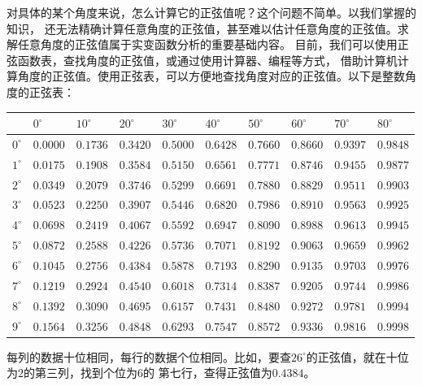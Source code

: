 \documentclass[12pt,UTF8,fontset=none]{ctexbook}
\begin{document}
对具体的某个角度来说，怎么计算它的正弦值呢？这个问题不简单。以我们掌握的知识，
还无法精确计算任意角度的正弦值，甚至难以估计任意角度的正弦值。求解任意角度的正弦值属于实变函数分析的重要基础内容。
目前，我们可以使用正弦函数表，查找角度的正弦值，或通过使用计算器、编程等方式，
借助计算机计算角度的正弦值。使用正弦表，可以方便地查找角度对应的正弦值。以下是整数角度的正弦表：

\begin{center}
    \begin{tabular}{| p{1em}<{\centering} | p{2.4em}<{\centering} | p{2.4em}<{\centering} | p{2.4em}<{\centering} | p{2.4em}<{\centering} | p{2.4em}<{\centering} | p{2.4em}<{\centering} | p{2.4em}<{\centering} | p{2.4em}<{\centering} | p{2.4em}<{\centering} |}
        \hline
                  & $0^\circ$& $10^\circ$ & $20^\circ$ & $30^\circ$ & $40^\circ$ & $50^\circ$ & $60^\circ$ & $70^\circ$ & $80^\circ$ \\ [0.5ex] 
        \hline
        $0^\circ$ & $0.0000$ &  $0.1736$  &  $0.3420$  &  $0.5000$  &  $0.6428$  &  $0.7660$  &  $0.8660$  &  $0.9397$  &  $0.9848$  \\
        \hline
        $1^\circ$ & $0.0175$ &  $0.1908$  &  $0.3584$  &  $0.5150$  &  $0.6561$  &  $0.7771$  &  $0.8746$  &  $0.9455$  &  $0.9877$  \\
        \hline
        $2^\circ$ & $0.0349$ &  $0.2079$  &  $0.3746$  &  $0.5299$  &  $0.6691$  &  $0.7880$  &  $0.8829$  &  $0.9511$  &  $0.9903$  \\
        \hline
        $3^\circ$ & $0.0523$ &  $0.2250$  &  $0.3907$  &  $0.5446$  &  $0.6820$  &  $0.7986$  &  $0.8910$  &  $0.9563$  &  $0.9925$  \\
        \hline
        $4^\circ$ & $0.0698$ &  $0.2419$  &  $0.4067$  &  $0.5592$  &  $0.6947$  &  $0.8090$  &  $0.8988$  &  $0.9613$  &  $0.9945$  \\
        \hline
        $5^\circ$ & $0.0872$ &  $0.2588$  &  $0.4226$  &  $0.5736$  &  $0.7071$  &  $0.8192$  &  $0.9063$  &  $0.9659$  &  $0.9962$  \\
        \hline
        $6^\circ$ & $0.1045$ &  $0.2756$  &  $0.4384$  &  $0.5878$  &  $0.7193$  &  $0.8290$  &  $0.9135$  &  $0.9703$  &  $0.9976$  \\
        \hline
        $7^\circ$ & $0.1219$ &  $0.2924$  &  $0.4540$  &  $0.6018$  &  $0.7314$  &  $0.8387$  &  $0.9205$  &  $0.9744$  &  $0.9986$  \\
        \hline
        $8^\circ$ & $0.1392$ &  $0.3090$  &  $0.4695$  &  $0.6157$  &  $0.7431$  &  $0.8480$  &  $0.9272$  &  $0.9781$  &  $0.9994$  \\
        \hline
        $9^\circ$ & $0.1564$ &  $0.3256$  &  $0.4848$  &  $0.6293$  &  $0.7547$  &  $0.8572$  &  $0.9336$  &  $0.9816$  &  $0.9998$  \\
        \hline
    \end{tabular}
\end{center}
每列的数据十位相同，每行的数据个位相同。比如，要查$26^\circ$的正弦值，就在十位为$2$的第三列，找到个位为$6$的
第七行，查得正弦值为$0.4384$。
\end{document}
